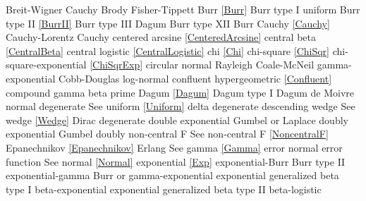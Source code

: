 Breit-Wigner  					\dotfill	Cauchy 								\ncite	%
Brody							\dotfill	Fisher-Tippett						\ncite	%
Burr							\dotfill	\eqref{Burr} 						\ncite	%
Burr type I						\dotfill	uniform 							\ncite	%
Burr type II					\dotfill	\eqref{BurrII} 						\ncite	%
Burr type III					\dotfill	Dagum								\ncite	%
Burr type XII					\dotfill	Burr 								\ncite	%
%
Cauchy	 						\dotfill	\eqref{Cauchy} 							%
Cauchy-Lorentz 					\dotfill	Cauchy 								\ncite	%
centered arcsine 				\dotfill	\eqref{CenteredArcsine} 			\ncite	%
central beta 					\dotfill	\eqref{CentralBeta}					\mcite{\self}
central logistic 				\dotfill	\eqref{CentralLogistic}				\mcite{\self}
chi								\dotfill	\eqref{Chi}							\ncite	%
chi-square						\dotfill	\eqref{ChiSqr}						\ncite	%
chi-square-exponential			\dotfill	\eqref{ChiSqrExp}					\mcite{\self}	%
circular normal					\dotfill	Rayleigh							\ncite %
Coale-McNeil 					\dotfill	gamma-exponential 					     %
Cobb-Douglas					\dotfill	log-normal 							\ncite	%
confluent hypergeometric 		\dotfill	\eqref{Confluent}					\ncite
compound gamma					\dotfill	beta prime								%
%
Dagum 							\dotfill	\eqref{Dagum} 						\ncite	%
Dagum type I 					\dotfill	Dagum								\ncite	%
de Moivre						\dotfill	normal 								\ncite	%
degenerate						\dotfill	See uniform \eqref{Uniform} 		\ncite	%
delta  							\dotfill	degenerate  						\ncite 	%
descending wedge				\dotfill	See wedge \eqref{Wedge} 			\ncite	%
Dirac							\dotfill	degenerate							\ncite	
double exponential 				\dotfill	Gumbel or Laplace 					\ncite	%
doubly exponential				\dotfill	Gumbel								\ncite	%
doubly non-central F       		\dotfill	See non-central F  					\eqref{NoncentralF} 	\ncite 
%
Epanechnikov					\dotfill	\eqref{Epanechnikov}				\ncite
Erlang							\dotfill	See gamma \eqref{Gamma} 			\ncite 	%
error 							\dotfill	normal 								\ncite	%
error function					\dotfill	See normal \eqref{Normal}			\ncite	%
exponential 					\dotfill	\eqref{Exp} 						\ncite	%
exponential-Burr				\dotfill	Burr type II 						\ncite	%
exponential-gamma				\dotfill	Burr 	or gamma-exponential		  		%
exponential generalized beta type I 	\dotfill	beta-exponential			 	%
exponential generalized beta type II 	\dotfill	beta-logistic				 	%
